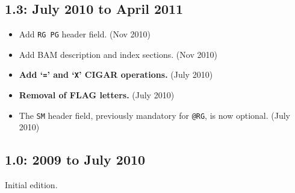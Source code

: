 \documentclass[10pt]{article}
\begin{document}
\begin{appendices}
\subsection*{1.3: July 2010 to April 2011}

\begin{itemize}
\item Add {\tt RG PG} header field. (Nov 2010)
\item Add BAM description and index sections. (Nov 2010)
\item \textbf{Add `{\tt =}' and `{\tt X}' CIGAR operations.} (July 2010)
\item \textbf{Removal of FLAG letters.} (July 2010)
\item The {\tt SM} header field, previously mandatory for {\tt @RG}, is now
optional. (July 2010)
\end{itemize}

\subsection*{1.0: 2009 to July 2010}

Initial edition.

\end{appendices}
\end{document}
